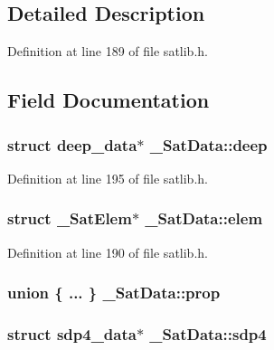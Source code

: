 \subsection{Detailed Description}


Definition at line 189 of file satlib.\-h.



\subsection{Field Documentation}
\hypertarget{struct___sat_data_aaa92af6491d38cb39ac15847e645d907}{
\subsubsection[{deep}]{\setlength{\rightskip}{0pt plus 5cm}struct {\bf deep\-\_\-data}$\ast$ \-\_\-\-Sat\-Data\-::deep}}\label{struct___sat_data_aaa92af6491d38cb39ac15847e645d907}


Definition at line 195 of file satlib.\-h.

\hypertarget{struct___sat_data_a8f6ca40e052cd0bac7ed283fa35147ef}{
\subsubsection[{elem}]{\setlength{\rightskip}{0pt plus 5cm}struct {\bf \-\_\-\-Sat\-Elem}$\ast$ \-\_\-\-Sat\-Data\-::elem}}\label{struct___sat_data_a8f6ca40e052cd0bac7ed283fa35147ef}


Definition at line 190 of file satlib.\-h.

\hypertarget{struct___sat_data_afdd865c8d5f71af2985b7292db552364}{
\subsubsection[{prop}]{\setlength{\rightskip}{0pt plus 5cm}union \{ ... \}   \-\_\-\-Sat\-Data\-::prop}}\label{struct___sat_data_afdd865c8d5f71af2985b7292db552364}
\hypertarget{struct___sat_data_ab7bfd91966db6411332426656d1a62f4}{
\subsubsection[{sdp4}]{\setlength{\rightskip}{0pt plus 5cm}struct {\bf sdp4\-\_\-data}$\ast$ \-\_\-\-Sat\-Data\-::sdp4}}\label{struct___sat_data_ab7bfd91966db6411332426656d1a62f4}



